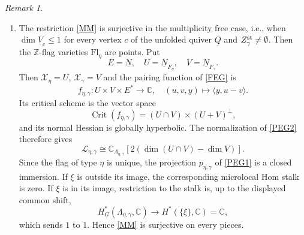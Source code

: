 \documentclass[11pt,reqno]{amsart}
\theoremstyle{definition}
\theoremstyle{remark}
\newtheorem{Remark}[Theorem]{Remark}
\def\bbC{\mathbb C}
\def\dN{\underline N}
\def\dG{\underline G}
\def\dV{\underline V}
\def\dQ{\underline Q}
\def\scrX{\mathscr X}
\def\Fl{\mathrm{Fl}}
\begin{document}
 
 
\begin{Remark}\label{rem:morse-evaluation-dual}\hfill
\begin{enumerate}[label=$\mathrm{(\alph*)}$,leftmargin=8mm]

\item
The restriction \eqref{MM} is surjective
in the multiplicity free case, i.e., when
$\dim\dV_c\leqslant1$ for every vertex $c$ of the unfolded quiver
$\dQ$ and $Z_\gamma^{\rm st}\ne\emptyset$.
Then the $\mathbb Z$-flag varieties $\Fl_\eta$ are points. Put
\[
E=\dN,\quad U=\dN_{F_\eta},\quad V=\dN_{F_\gamma}.
\]
Then $\scrX_\eta=U$, $\scrX_\gamma=V$ and the pairing function
of \eqref{FEG} is
\[
f_{\eta,\gamma}:U\times V\times E^*\longrightarrow\bbC,
\quad (u,v,y)\longmapsto\langle y,u-v\rangle.
\]
Its critical scheme is the vector space
\[
\operatorname{Crit}(f_{\eta,\gamma})=(U\cap V)\times(U+V)^\perp,
\]
and its normal Hessian is globally hyperbolic. The normalization
of \eqref{PEG2} therefore gives
\[
\mathscr L_{\eta,\gamma}\cong
\bbC_{\Lambda_{\eta,\gamma}}
 [2(\dim(U\cap V)-\dim V)].
\]
Since the flag of type $\eta$ is unique, the projection
$p_{\eta,\gamma}$ of \eqref{PEG1} is a closed immersion.
If $\xi$ is outside its image, the corresponding microlocal Hom
stalk is zero. If $\xi$ is in its image, restriction to the stalk
is, up to the displayed common shift,
\[
H_{\dG}^*(\Lambda_{\eta,\gamma},\bbC)
\longrightarrow H^*(\{\xi\},\bbC)=\bbC,
\]
which sends $1$ to $1$. Hence \eqref{MM} is surjective on every
pieces. 




\end{enumerate}
\end{Remark}
\end{document}
